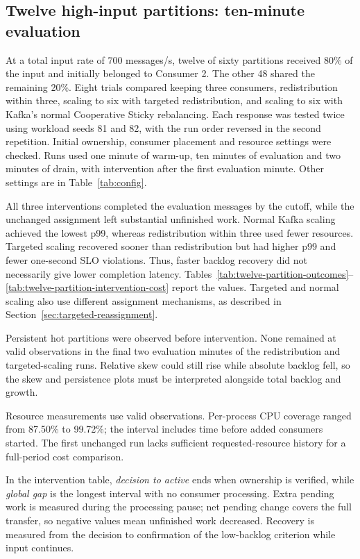 \subsection{Twelve high-input partitions: ten-minute evaluation}\label{sec:twelve-partition-updated}\label{sec:four-condition-results}
At a total input rate of 700 messages/s, twelve of sixty partitions received 80\% of the input and initially belonged to Consumer 2. The other 48 shared the remaining 20\%. Eight trials compared keeping three consumers, redistribution within three, scaling to six with targeted redistribution, and scaling to six with Kafka's normal Cooperative Sticky rebalancing. Each response was tested twice using workload seeds 81 and 82, with the run order reversed in the second repetition. Initial ownership, consumer placement and resource settings were checked. Runs used one minute of warm-up, ten minutes of evaluation and two minutes of drain, with intervention after the first evaluation minute. Other settings are in Table~\ref{tab:config}.

All three interventions completed the evaluation messages by the cutoff, while the unchanged assignment left substantial unfinished work. Normal Kafka scaling achieved the lowest p99, whereas redistribution within three used fewer resources. Targeted scaling recovered sooner than redistribution but had higher p99 and fewer one-second SLO violations. Thus, faster backlog recovery did not necessarily give lower completion latency. Tables~\ref{tab:twelve-partition-outcomes}--\ref{tab:twelve-partition-intervention-cost} report the values. Targeted and normal scaling also use different assignment mechanisms, as described in Section~\ref{sec:targeted-reassignment}.

Persistent hot partitions were observed before intervention. None remained at valid observations in the final two evaluation minutes of the redistribution and targeted-scaling runs. Relative skew could still rise while absolute backlog fell, so the skew and persistence plots must be interpreted alongside total backlog and growth.

Resource measurements use valid observations. Per-process CPU coverage ranged from 87.50\% to 99.72\%; the interval includes time before added consumers started. The first unchanged run lacks sufficient requested-resource history for a full-period cost comparison.

In the intervention table, \emph{decision to active} ends when ownership is verified, while \emph{global gap} is the longest interval with no consumer processing. Extra pending work is measured during the processing pause; net pending change covers the full transfer, so negative values mean unfinished work decreased. Recovery is measured from the decision to confirmation of the low-backlog criterion while input continues.

